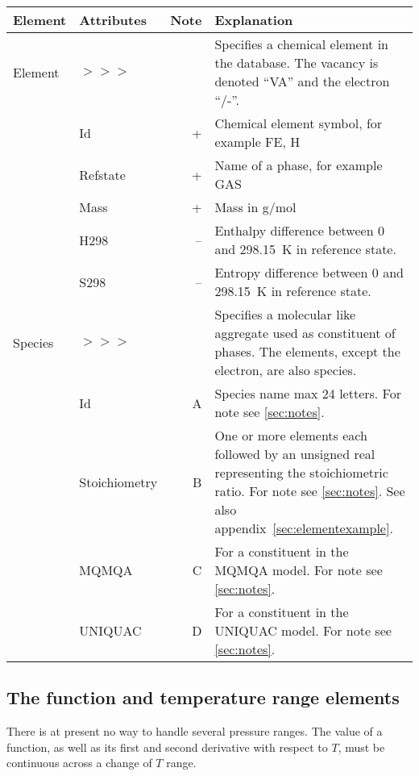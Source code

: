 \documentclass{article}
\begin{document}
\bigskip
\begin{tabular}{|p{} p{} r p{}|}\hline
  Element & Attributes & Note & Explanation\\\hline

  Element &$>>>$&& Specifies a chemical element in the database.  The vacancy is denoted ``VA'' and the electron ``/-''.\\
          & Id        & +    & Chemical element symbol, for example FE, H \\
          & Refstate  & +    & Name of a phase, for example GAS \\
          & Mass      & +    & Mass in g/mol\\
          & H298      & --    & Enthalpy difference between 0 and 298.15~K in reference state.\\
          & S298      & --    & Entropy difference between 0 and 298.15~K in reference state.\\\hline

  Species &$>>>$&& Specifies a molecular like aggregate used as constituent of phases.  The elements, except the electron, are also species.\\
          & Id        & A & Species name max 24 letters. For note see \ref{sec:notes}.\\
          & Stoichiometry & B & One or more elements each followed by an unsigned real representing the stoichiometric ratio.  For note see \ref{sec:notes}.  See also appendix~\ref{sec:elementexample}.\\
          & MQMQA & C & For a constituent in the MQMQA model.  For note see \ref{sec:notes}.\\
          & UNIQUAC & D & For a constituent in the UNIQUAC model.  For note see \ref{sec:notes}.\\\hline

\end{tabular}

\subsection{The function and temperature range elements}

There is at present no way to handle several pressure ranges.  The
value of a function, as well as its first and second derivative with
respect to $T$, must be continuous across a change of $T$ range.
\end{document}
